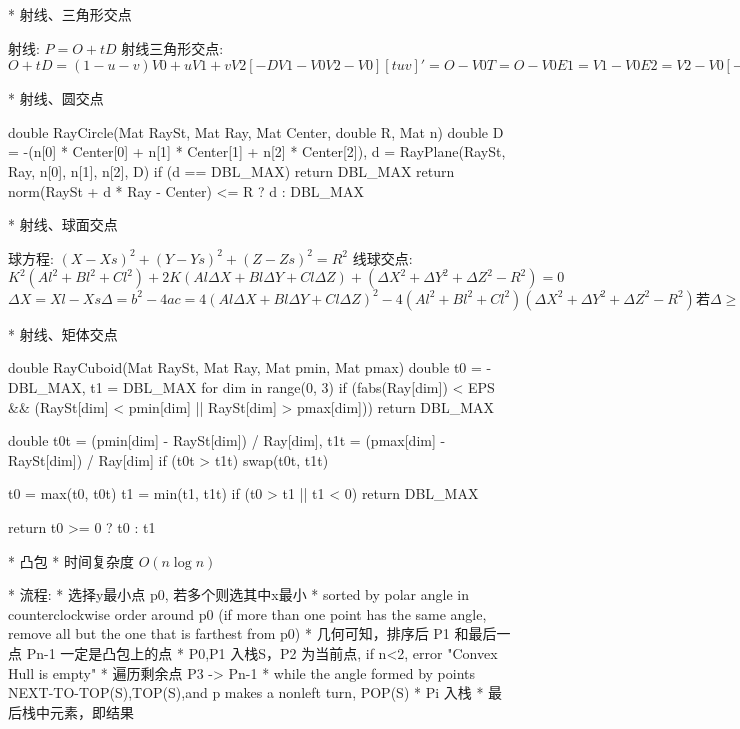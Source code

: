 		* 射线、三角形交点

			\Proof
				射线: $P = O + t D$
				射线三角形交点:
				$
						O + t D = (1 - u - v)V0 + u V1 + v V2
						[ -D  V1-V0  V2-V0] [ t  u  v ]' = O - V0
						T = O - V0	E1 = V1 - V0	E2 = V2 - V0
						[ -D  E1  E2 ] [ t  u  v ]' = T
						t = | T  E1  E2| / |-D  E1  E2|
						u = |-D   T  E2| / |-D  E1  E2|
						v = |-D  E1  E2| / |-D  E1  E2|
				(混合积公式): |a  b  c| = a × b·c = -a × c·b
						t = (T × E1·E2) / (D × E2·E1)
						u = (D × E2· T) / (D × E2·E1)
						v = (T × E1· D) / (D × E2·E1)
				$

		* 射线、圆交点

			\Codes
				double RayCircle(Mat RaySt, Mat Ray, Mat Center, double R, Mat n)
					double D = -(n[0] * Center[0] + n[1] * Center[1] + n[2] * Center[2]),
						d = RayPlane(RaySt, Ray, n[0], n[1], n[2], D)
					if (d == DBL_MAX)
						return DBL_MAX
					return norm(RaySt + d * Ray - Center) <= R ? d : DBL_MAX

			* 射线、球面交点

			\Proof
				球方程: $(X - Xs)^2 + (Y - Ys)^2 + (Z - Zs)^2 = R^2$
				线球交点: $K^2(Al^2 + Bl^2 + Cl^2) + 2K(Al ΔX + Bl ΔY + Cl ΔZ) + (ΔX^2 + ΔY^2 + ΔZ^2 - R^2) = 0$
				$
						ΔX = Xl - Xs
						Δ = b^2 - 4ac = 4(Al ΔX + Bl ΔY + Cl ΔZ)^2 - 4(Al^2 + Bl^2 + Cl^2)(ΔX^2 + ΔY^2 + ΔZ^2 - R^2)
						若Δ≥0 有交点.
						K = ( -b ± sqrt(Δ) ) / 2a	即光线走过线距离
				$

		* 射线、矩体交点

			\Codes
				double RayCuboid(Mat RaySt, Mat Ray, Mat pmin, Mat pmax)
					double t0 = -DBL_MAX, t1 = DBL_MAX
					for dim in range(0, 3)
						if (fabs(Ray[dim]) < EPS && (RaySt[dim] < pmin[dim] || RaySt[dim] > pmax[dim])) 
							return DBL_MAX

						double
							t0t = (pmin[dim] - RaySt[dim]) / Ray[dim],
							t1t = (pmax[dim] - RaySt[dim]) / Ray[dim]
						if (t0t > t1t)
							swap(t0t, t1t)

						t0 = max(t0, t0t)
						t1 = min(t1, t1t)
						if (t0 > t1 || t1 < 0)
							return DBL_MAX

					return t0 >= 0 ? t0 : t1
			
	* 凸包
			\Property
				* 时间复杂度 $O(n \log n)$

			* 流程:
				* 选择y最小点 p0, 若多个则选其中x最小
				* sorted by polar angle in counterclockwise order around p0 (if more than one point has the same angle, remove all but the one that is farthest from p0)
					* 几何可知，排序后 P1 和最后一点 Pn-1 一定是凸包上的点
				* P0,P1 入栈S，P2 为当前点, if n<2, error "Convex Hull is empty"
				* 遍历剩余点 P3 -> Pn-1
					* while the angle formed by points NEXT-TO-TOP(S),TOP(S),and p makes a nonleft turn, POP(S)
					* Pi 入栈
				* 最后栈中元素，即结果

